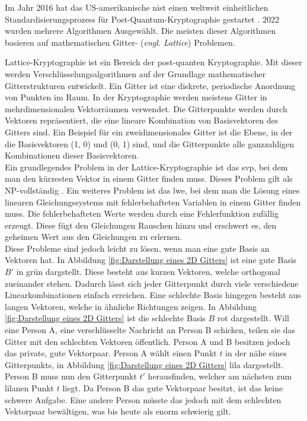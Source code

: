 Im Jahr 2016 hat das US-amerikanische \ac{nist} einen weltweit einheitlichen Standardisierungsprozess für Post-Quantum-Kryptographie gestartet \cite{moody_status_2022}.
2022 wurden mehrere Algorithmen Ausgewählt. Die meisten dieser Algorithmen basieren auf mathematischen Gitter- (\textit{engl. Lattice}) Problemen.

Lattice-Kryptographie \cite{micciancio_lattice-based_nodate} ist ein Bereich der post-quanten Kryptographie. 
Mit dieser werden Verschlüsselungsalgorithmen auf der Grundlage mathematischer Gitterstrukturen entwickelt. 
Ein Gitter ist eine diskrete, periodische Anordnung von Punkten im Raum. In der Kryptographie werden meistens Gitter in mehrdimensionalen Vektorräumen verwendet.
Die Gitterpunkte werden durch Vektoren repräsentiert, die eine lineare Kombination von Basisvektoren des Gitters sind. 
Ein Beispiel für ein zweidimensionales Gitter ist die Ebene, in der die Basisvektoren (1, 0) und (0, 1) sind, 
und die Gitterpunkte alle ganzzahligen Kombinationen dieser Basisvektoren.\\

Ein grundlegendes Problem in der Lattice-Kryptographie ist das \ac{svp}, bei dem man den kürzesten Vektor in einem Gitter finden muss. 
Dieses Problem gilt als NP-vollständig \cite[Abs. 2.1]{wang_lattice-based_2023}.
Ein weiteres Problem ist das \ac{lwe}, bei dem man die Lösung eines linearen Gleichungssystems mit fehlerbehafteten Variablen in einem Gitter finden muss.
Die fehlerbehafteten Werte werden durch eine Fehlerfunktion zufällig erzeugt. Diese fügt den Gleichungen Rauschen hinzu und erschwert es, den geheimen Wert aus den Gleichungen zu erlernen.\\

Diese Probleme sind jedoch leicht zu lösen, wenn man eine gute Basis an Vektoren hat. In Abbildung \ref{fig:Darstellung eines 2D Gitters} ist eine gute Basis $B'$ in grün dargstellt. Diese besteht aus kurzen Vektoren, welche orthogonal zueinander stehen. Dadurch lässt sich jeder Gitterpunkt durch viele verschiedene Linearkombinationen einfach erreichen. Eine schlechte Basis hingegen besteht aus langen Vektoren, welche in ähnliche Richtungen zeigen. In Abbildung \ref{fig:Darstellung eines 2D Gitters} ist die schlechte Basis $B$ rot dargestellt. Will eine Person A, eine verschlüsselte Nachricht an Person B schicken, teilen sie das Gitter mit den schlechten Vektoren öffentlich. Person A und B besitzen jedoch das private, gute Vektorpaar. Person A wählt einen Punkt $t$ in der nähe eines Gitterpunkts, in Abbildung \ref{fig:Darstellung eines 2D Gitters} lila dargestellt. Person B muss nun den Gitterpunkt $t'$ herausfinden, welcher am nächsten zum lilanen Punkt $t$ liegt. Da Person B das gute Vektorpaar besitzt, ist das keine schwere Aufgabe. Eine andere Person müsste das jedoch mit dem schlechten Vektorpaar bewältigen, was bis heute als enorm schwierig gilt.

